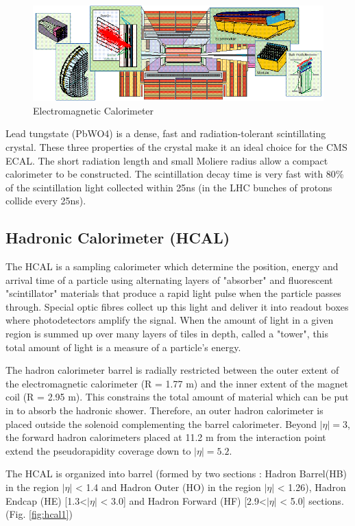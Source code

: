 \begin{figure}[H]
  \caption{Electromagnetic Calorimeter \label{fig:caloc}}
  \centering
\includegraphics[width=14cm]{CMS_chapter_plots/caloc}
\end{figure}
\noindent
Lead tungstate (PbWO4) is a dense, fast and radiation-tolerant scintillating crystal. These three properties of the crystal make it an ideal choice for the CMS ECAL. The short radiation length and small Moliere radius allow a compact calorimeter to be constructed. The scintillation decay time is very fast with 80$\%$ of the scintillation light collected within 25ns (in the LHC bunches of protons collide every 25ns). 

\subsection{Hadronic Calorimeter (HCAL)}

The HCAL is a sampling calorimeter which determine the position, energy and arrival time of a particle using alternating	 layers of "absorber" and fluorescent "scintillator" materials that produce a rapid light pulse when the particle passes through. Special optic fibres collect up this light and deliver it into readout boxes where photodetectors amplify the signal. When the amount of light in a given region is summed up over many layers of tiles in depth, called a "tower", this total amount of light is a measure of a particle’s energy. 

The hadron calorimeter barrel is radially restricted between the outer extent of the electromagnetic calorimeter (R = 1.77 m) and the inner extent of the magnet coil (R = 2.95 m). This constrains the total amount of material which can be put in to absorb the hadronic shower. Therefore, an outer hadron calorimeter is placed outside the solenoid complementing the barrel calorimeter. Beyond $|\eta| = 3$, the forward hadron calorimeters placed at 11.2 m from the interaction point extend the pseudorapidity coverage down to $|\eta| = 5.2$. 

The HCAL is organized into barrel (formed by two sections : Hadron Barrel(HB) in the region $|\eta|$ < 1.4 and Hadron Outer (HO) in the region $|\eta|$ < 1.26), Hadron Endcap (HE) [1.3<$|\eta|$ < 3.0]  and Hadron Forward (HF) [2.9<$|\eta|$ < 5.0]  sections.(Fig. \ref{fig:hcal1})

